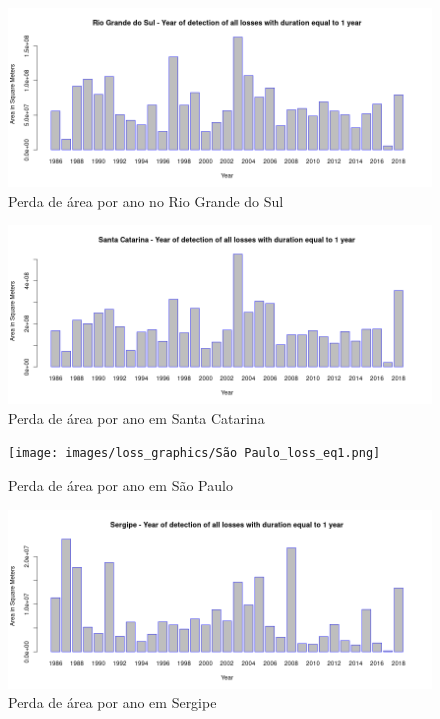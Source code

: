 \begin{appendices}
\begin{figure}[H]
    \centering
    \includegraphics[scale=.5]{images/loss_graphics/Rio Grande do Sul_loss_eq1.png}
    \caption{Perda de área por ano no Rio Grande do Sul}
    \label{fig:loss_rio_grande_do_sul}
\end{figure}

\begin{figure}[H]
    \centering
    \includegraphics[scale=.5]{images/loss_graphics/Santa Catarina_loss_eq1.png}
    \caption{Perda de área por ano em Santa Catarina}
    \label{fig:loss_santa_catarina}
\end{figure}

\begin{figure}[H]
    \centering
    \texttt{[image: images/loss\_graphics/São Paulo\_loss\_eq1.png]}
    \caption{Perda de área por ano em São Paulo}
    \label{fig:loss_sao_paulo}
\end{figure}

\begin{figure}[H]
    \centering
    \includegraphics[scale=.5]{images/loss_graphics/Sergipe_loss_eq1.png}
    \caption{Perda de área por ano em Sergipe}
    \label{fig:loss_sergipe}
\end{figure}

\end{appendices}